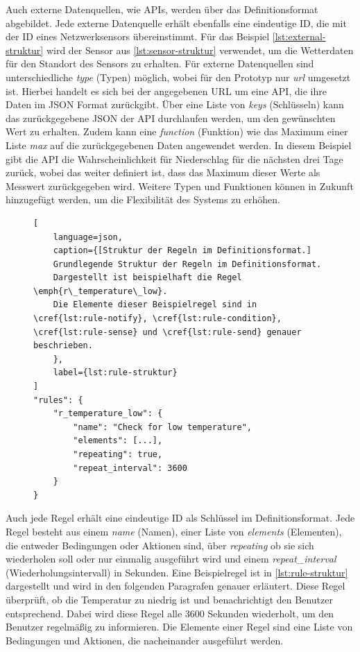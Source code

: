 Auch externe Datenquellen, wie APIs, werden über das Definitionsformat abgebildet.
Jede externe Datenquelle erhält ebenfalls eine eindeutige ID, die mit der ID eines Netzwerksensors übereinstimmt.
Für das Beispiel \cref{lst:external-struktur} wird der Sensor aus \cref{lst:sensor-struktur} verwendet, um die Wetterdaten für den Standort des Sensors zu erhalten.
Für externe Datenquellen sind unterschiedliche \emph{type} (Typen) möglich, wobei für den Prototyp nur \emph{url} umgesetzt ist.
Hierbei handelt es sich bei der angegebenen URL um eine API, die ihre Daten im JSON Format zurückgibt.
Über eine Liste von \emph{keys} (Schlüsseln) kann das zurückgegebene JSON der API durchlaufen werden, um den gewünschten Wert zu erhalten.
Zudem kann eine \emph{function} (Funktion) wie das Maximum einer Liste \emph{max} auf die zurückgegebenen Daten angewendet werden.
In diesem Beispiel gibt die API die Wahrscheinlichkeit für Niederschlag für die nächsten drei Tage zurück, wobei das weiter definiert ist, dass das Maximum dieser Werte als Messwert zurückgegeben wird.
Weitere Typen und Funktionen können in Zukunft hinzugefügt werden, um die Flexibilität des Systems zu erhöhen.

\begin{figure}[!htb]
\begin{lstlisting}[
	language=json,
	caption={[Struktur der Regeln im Definitionsformat.]
	Grundlegende Struktur der Regeln im Definitionsformat.
	Dargestellt ist beispielhaft die Regel \emph{r\_temperature\_low}.
	Die Elemente dieser Beispielregel sind in \cref{lst:rule-notify}, \cref{lst:rule-condition}, \cref{lst:rule-sense} und \cref{lst:rule-send} genauer beschrieben.
	},
	label={lst:rule-struktur}
]
"rules": {
	"r_temperature_low": {
		"name": "Check for low temperature",
		"elements": [...],
		"repeating": true,
		"repeat_interval": 3600
	}
}
\end{lstlisting}
\end{figure}

Auch jede Regel erhält eine eindeutige ID als Schlüssel im Definitionsformat.
Jede Regel besteht aus einem \emph{name} (Namen), einer Liste von \emph{elements} (Elementen), die entweder Bedingungen oder Aktionen sind, über \emph{repeating} ob sie sich wiederholen soll oder nur einmalig ausgeführt wird und einem \emph{repeat\_interval} (Wiederholungsintervall) in Sekunden.
Eine Beispielregel ist in \cref{lst:rule-struktur} dargestellt und wird in den folgenden Paragrafen genauer erläutert.
Diese Regel überprüft, ob die Temperatur zu niedrig ist und benachrichtigt den Benutzer entsprechend.
Dabei wird diese Regel alle 3600 Sekunden wiederholt, um den Benutzer regelmäßig zu informieren.
Die Elemente einer Regel sind eine Liste von Bedingungen und Aktionen, die nacheinander ausgeführt werden.

